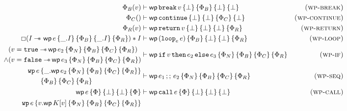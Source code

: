 \documentclass{article}
\numberwithin{algorithm}{section}
\newcommand{\progspec}[1]{\{ #1 \}}
\newcommand{\true}{\texttt{true}}
\newcommand{\false}{\texttt{false}}
\newcommand{\cmdloop}[1]{\texttt{loop}_{#1}\,}
\newcommand{\cmdbreak}{\texttt{break}\,}
\newcommand{\cmdcontinue}{\texttt{continue}}
\newcommand{\cmdreturn}{\texttt{return}\,}
\newcommand{\cmdif}{\texttt{if}\,}
\newcommand{\cmdthen}{\,\texttt{then}\,}
\newcommand{\cmdelse}{\,\texttt{else}\,}
\newcommand{\cmdseq}{\,;;\,}
\newcommand{\cmdcall}{\texttt{call}\,}
\newcommand{\pure}[1]{\text{PenCtx}(#1)}
\newcommand{\cred}{\text{red}}
\newcommand{\wand}{-\mkern-8mu*\,}
\newcommand{\wpre}[5]{\textsf{wp}\, #1\, \progspec{#2}\, \progspec{#3}\, \progspec{#4}\, \progspec{#5}}
\begin{document}


\begin{figure}[h]
    $$
    \begin{aligned}
        \Phi_B(v) &\vdash \wpre{\cmdbreak v}{\bot}{\Phi_B}{\bot}{\bot} & \textsc{(wp-break)} \\
        \Phi_C() &\vdash \wpre{\cmdcontinue}{\bot}{\bot}{\Phi_C}{\bot} & \textsc{(wp-continue)} \\
        \Phi_R(v) &\vdash \wpre{\cmdreturn v}{\bot}{\bot}{\bot}{\Phi_R} & \textsc{(wp-return)} \\
        \Box(I \wand{}\, \wpre{e}{\_. I}{\Phi_B}{\_. I}{\Phi_R}) * I &\vdash \wpre{(\cmdloop{e}e)}{\Phi_B}{\bot}{\bot}{\Phi_R} & \textsc{(wp-loop)} \\
        \begin{aligned}
            &(v = \true \wand \wpre{e_2}{\Phi_N}{\Phi_B}{\Phi_C}{\Phi_R}) \\
            \land &(v = \false \wand \wpre{e_3}{\Phi_N}{\Phi_B}{\Phi_C}{\Phi_R})
        \end{aligned} &\vdash \wpre{\cmdif v \cmdthen e_2 \cmdelse e_3}{\Phi_N}{\Phi_B}{\Phi_C}{\Phi_R} & \textsc{(wp-if)} \\
        \begin{aligned}
            \texttt{wp}\,e\,& \progspec{\_.\wpre{e_2}{\Phi_N}{\Phi_B}{\Phi_C}{\Phi_R}} \\
                            & \progspec{\Phi_B}\,\progspec{\Phi_C}\,\progspec{\Phi_R}
        \end{aligned} &\vdash \wpre{e_1 \cmdseq e_2}{\Phi_N}{\Phi_B}{\Phi_C}{\Phi_R} & \textsc{(wp-seq)} \\
        \wpre{e}{\Phi}{\bot}{\bot}{\Phi} &\vdash \wpre{\cmdcall e}{\Phi}{\bot}{\bot}{\bot} & \textsc{(wp-call)} \\
        \begin{aligned}
            \texttt{wp}\,e\,& \progspec{v. \wpre{K[v]}{\Phi_N}{\Phi_B}{\Phi_C}{\Phi_R}} \\

\end{aligned}
\end{aligned}$$
\end{figure}
\end{document}
